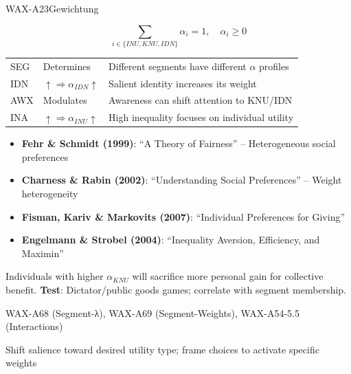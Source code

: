 \begin{axiomspec}{WAX-A23}{Gewichtung}

\begin{equation}
\sum_{i \in \{INU, KNU, IDN\}} \alpha_i = 1, \quad \alpha_i \geq 0
\end{equation}

\begin{tabular}{lll}
SEG & Determines & Different segments have different $\alpha$ profiles \\
IDN & $\uparrow \Rightarrow \alpha_{IDN} \uparrow$ & Salient identity increases its weight \\
AWX & Modulates & Awareness can shift attention to KNU/IDN \\
INA & $\uparrow \Rightarrow \alpha_{INU} \uparrow$ & High inequality focuses on individual utility \\
\end{tabular}

\begin{itemize}
\item \textbf{Fehr \& Schmidt (1999)}: ``A Theory of Fairness'' -- Heterogeneous social preferences
\item \textbf{Charness \& Rabin (2002)}: ``Understanding Social Preferences'' -- Weight heterogeneity
\item \textbf{Fisman, Kariv \& Markovits (2007)}: ``Individual Preferences for Giving''
\item \textbf{Engelmann \& Strobel (2004)}: ``Inequality Aversion, Efficiency, and Maximin''
\end{itemize}

Individuals with higher $\alpha_{KNU}$ will sacrifice more personal gain for collective benefit.
\textbf{Test}: Dictator/public goods games; correlate with segment membership.

WAX-A68 (Segment-λ), WAX-A69 (Segment-Weights), WAX-A54-5.5 (Interactions)

Shift salience toward desired utility type; frame choices to activate specific weights

\end{axiomspec}


